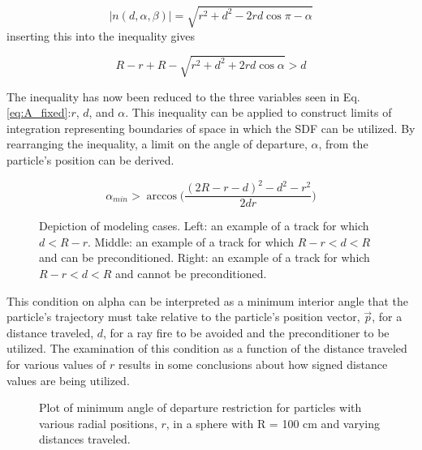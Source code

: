\begin{equation}
|n(d,\alpha,\beta)| = \sqrt{r^2 + d^2 - 2rd \cos{\pi-\alpha}}
\end{equation}
inserting this into the inequality gives

\begin{equation}
R-r + R - \sqrt{r^2 + d^2 + 2rd \cos{\alpha}} > d
\end{equation}

The inequality has now been reduced to the three variables seen in
Eq. \ref{eq:A_fixed}:$r$, $d$, and $\alpha$. This inequality can be applied to
construct limits of integration representing boundaries of space in which the
SDF can be utilized. By rearranging the inequality, a limit on the angle of
departure, $\alpha$, from the particle's position can be derived.

\begin{equation}
\alpha_{min} > \arccos\Bigg ( \frac{(2R-r-d)^2-d^2-r^2}{2 d r} \Bigg )
\end{equation}

\begin{figure}[ht]
  \centering
  {\textwidth}
  \caption{Depiction of modeling cases. Left: an example of a track for which
    $d < R - r$. Middle: an example of a track for which $R-r < d < R$ and can be
    preconditioned.  Right: an example of a track for which $R-r < d < R$ and
    cannot be preconditioned.}
  \label{fig:modeling_cases}
\end{figure}

This condition on alpha can be interpreted as a minimum interior angle that the
particle's trajectory must take relative to the particle's position vector,
$\vec{p}$, for a distance traveled, $d$, for a ray fire to be avoided and the
preconditioner to be utilized. The examination of this condition as a function
of the distance traveled for various values of $r$ results in some conclusions
about how signed distance values are being utilized.

\begin{figure}
\centering
{\textwidth}
\caption{Plot of minimum angle of departure restriction for particles with
various radial positions, $r$, in a sphere with R = 100 cm and varying distances traveled.}
\end{figure}

